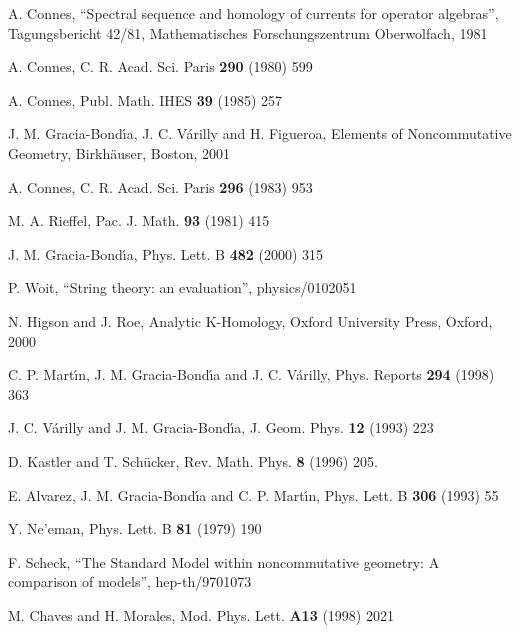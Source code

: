 \documentclass[a4paper,12pt]{article}
\providecommand{\1}{\mathbf{1}}         %
\providecommand{\7}{\dagger}            %
\providecommand{\8}{\bullet}            %
\renewcommand{\.}{\cdot}            %
\renewcommand{\:}{\colon}           %
\begin{document}
\begin{thebibliography}{92}

A. Connes,
``Spectral sequence and homology of currents for operator algebras'',
Tagungsbericht 42/81,
Mathematisches Forschungszentrum Oberwolfach, 1981

A. Connes,
C. R. Acad. Sci. Paris {\bf 290} (1980) 599

A. Connes,
Publ. Math. IHES {\bf 39} (1985) 257

J. M. Gracia-Bond\'{\i}a, J. C. V\'arilly and H. Figueroa,
Elements of Noncommutative Geometry,
Birkh\"auser, Boston, 2001

A. Connes,
C. R. Acad. Sci. Paris {\bf 296} (1983) 953

M. A. Rieffel,
Pac. J. Math. {\bf 93} (1981) 415

J. M. Gracia-Bond\'{\i}a,
Phys. Lett. B {\bf 482} (2000) 315

P. Woit,
``String theory: an evaluation'',
physics/0102051

N. Higson and J. Roe,
Analytic K-Homology,
Oxford University Press, Oxford, 2000

C. P. Mart\'{\i}n, J. M. Gracia-Bond\'{\i}a and J. C. V\'arilly,
Phys. Reports {\bf 294} (1998) 363

J. C. V\'arilly and J. M. Gracia-Bond\'{\i}a,
J. Geom. Phys. {\bf 12} (1993) 223

D. Kastler and T. Sch\"ucker,
Rev. Math. Phys. {\bf 8} (1996) 205.

E. Alvarez, J. M. Gracia-Bond\'{\i}a and C. P. Mart\'{\i}n,
Phys. Lett. B {\bf 306} (1993) 55

Y. Ne'eman,
Phys. Lett. B {\bf 81} (1979) 190

F. Scheck,
``The Standard Model within noncommutative geometry: A comparison of
models'',
hep-th/9701073

M. Chaves and H. Morales,
Mod. Phys. Lett. {\bf A13} (1998) 2021


\end{thebibliography}
\end{document}
